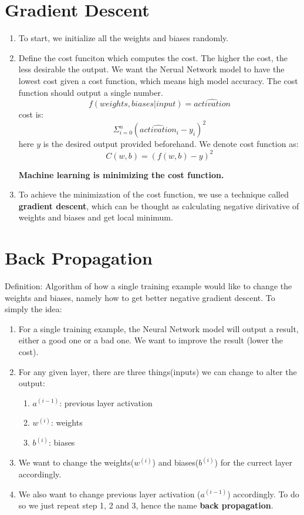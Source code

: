 \documentclass{article}
\begin{document}
\section{Gradient Descent}
    \begin{enumerate}
        \item To start, we initialize all the weights and biases randomly.
        \item Define the cost funciton which computes the cost. The higher the cost, the less desirable the output. We want the Nerual Network model to have the lowest cost given a cost function, which means high model accuracy. The cost function should output a single number.
            $$f(weights, biases | input)=\hat{activation}$$
            cost is:
            $$\Sigma_{i=0}^n(\hat{activation}_i - y_i)^2$$
            here $y$ is the desired output provided beforehand. We denote cost function as:
            $$ C(w,b) = (f(w,b)-y)^2 $$

    \textbf{Machine learning is minimizing the cost function.}
    
        \item To achieve the minimization of the cost function, we use a technique called \textbf{gradient descent}, which can be thought as calculating negative dirivative of weights and biases and get local minimum.
    \end{enumerate}

\section{Back Propagation}
    Definition: Algorithm of how a single training example would like to change the weights and biases, namely how to get better negative gradient descent. To simply the idea: 
        \begin{enumerate}
            \item For a single training example, the Neural Network model will output a result, either a good one or a bad one. We want to improve the result (lower the cost).
            \item For any given layer, there are three things(inputs) we can change to alter the output:
                \begin{enumerate}
                    \item $a^{(i-1)}$: previous layer activation
                    \item $w^{(i)}$: weights
                    \item $b^{(i)}$: biases
                \end{enumerate}
            \item We want to change the weights($w^{(i)}$) and biases($b^{(i)}$) for the currect layer accordingly.
            \item We also want to change previous layer activation ($a^{(i-1)}$) accordingly. To do so we just repeat step 1, 2 and 3, hence the name \textbf{back propagation}.
        \end{enumerate}
\end{document}
